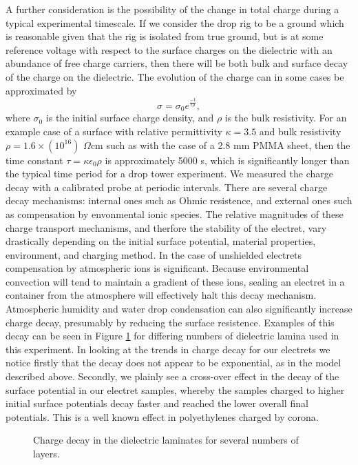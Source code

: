 \documentclass[12pt,a4paper,oneside]{book}
\begin{document}
A further consideration is the possibility of the change in total charge during a typical experimental timescale. If we consider the drop rig to be a ground which is reasonable given that the rig is isolated from true ground, but is at some reference voltage with respect to the surface charges on the dielectric with an abundance of free charge carriers, then there will be both bulk and surface decay of the charge on the dielectric. The evolution of the charge can in some cases be approximated by
\[ \sigma = \sigma_0 e^{\frac{-t}{\epsilon \rho}}, \]
where $\sigma_0$ is the initial surface charge density, and $\rho$ is the bulk resistivity. For an example case of a surface with relative permittivity $\kappa = 3.5$ and bulk resistivity $\rho = 1.6 \times (10^{16})$ $\Omega$cm such as with the case of a 2.8 mm PMMA sheet, then the time constant $\tau = \kappa \epsilon_0 \rho$ is approximately 5000 s, which is significantly longer than the typical time period for a drop tower experiment. We measured the charge decay with a calibrated probe at periodic intervals. There are several charge decay mechanisms: internal ones such as Ohmic resistence, and external ones such as compensation by envonmental ionic species. The relative magnitudes of these charge transport mechanisms, and therfore the stability of the electret, vary drastically depending on the initial surface potential, material properties, environment, and charging method. In the case of unshielded electrets compensation by atmospheric ions is significant\cite{perlman_electrets_1973}. Because environmental convection will tend to  maintain a gradient of these ions, sealing an electret in a container from the atmosphere will effectively halt this decay mechanism. Atmospheric humidity and water drop condensation can also significantly increase charge decay, presumably by reducing the surface resistence\cite{haenen_characteristic_1975}. Examples of this decay can be seen in Figure \ref{fig:charge_decay} for differing numbers of dielectric lamina used in this experiment. In looking at the trends in charge decay for our electrets we notice firstly that the decay does not appear to be exponential, as in the model described above. Secondly, we plainly see a cross-over effect in the decay of the surface potential in our electret samples, whereby the samples charged to higher initial surface potentials decay faster and reached the lower overall final potentials. This is a well known effect in polyethylenes charged by corona\cite{ferreira_corona_1992}.
\begin{figure}[htb!]
    \centering
    {}
       \caption{Charge decay in the dielectric laminates for several numbers of layers.\label{fig:charge_decay}}
\end{figure}
\newpage
\end{document}
